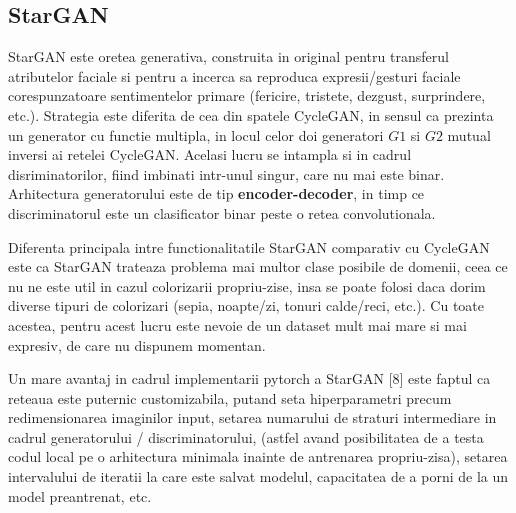 \documentclass[12pt]{article}
\theoremstyle{definition}
\begin{document}
\subsection{StarGAN}

StarGAN este oretea generativa, construita in original pentru transferul atributelor faciale si pentru a incerca sa reproduca expresii/gesturi faciale corespunzatoare sentimentelor primare (fericire, tristete, dezgust, surprindere, etc.). Strategia este diferita de cea din spatele CycleGAN, in sensul ca prezinta un generator cu functie multipla, in locul celor doi generatori $G1$ si $G2$ mutual inversi ai retelei CycleGAN. Acelasi lucru se intampla si in cadrul disriminatorilor, fiind imbinati intr-unul singur, care nu mai este binar. Arhitectura generatorului este de tip \textbf{encoder-decoder}, in timp ce discriminatorul este un clasificator binar peste o retea convolutionala. 

Diferenta principala intre functionalitatile StarGAN comparativ cu CycleGAN este ca StarGAN trateaza problema mai multor clase posibile de domenii, ceea ce nu ne este util in cazul colorizarii propriu-zise, insa se poate folosi daca dorim diverse tipuri de colorizari (sepia, noapte/zi, tonuri calde/reci, etc.). Cu toate acestea, pentru acest lucru este nevoie de un dataset mult mai mare si mai expresiv, de care nu dispunem momentan.

Un mare avantaj in cadrul implementarii pytorch a StarGAN [8] este faptul ca reteaua este puternic customizabila, putand seta hiperparametri precum redimensionarea imaginilor input, setarea numarului de straturi intermediare in cadrul generatorului / discriminatorului, (astfel avand posibilitatea de a testa codul local pe o arhitectura minimala inainte de antrenarea propriu-zisa), setarea intervalului de iteratii la care este salvat modelul, capacitatea de a porni de la un model preantrenat, etc.
\end{document}
